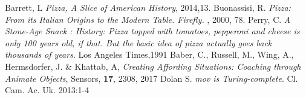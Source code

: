 \documentclass[preprint,12pt]{elsarticle}
\begin{document}
\begin{thebibliography}{00}


 Barrett, L  {\em Pizza, A Slice of American History}, 2014,13.
 Buonassisi, R. {\em Pizza: From its Italian Origins to the Modern Table. Firefly.} , 2000, 78.
 Perry, C. {\em A Stone-Age Snack : History: Pizza topped with tomatoes, pepperoni and cheese is only 100 years old, if that. But the basic idea of pizza actually goes back thousands of years}. Los Angeles Times,1991
 Baber, C., Russell, M., Wing, A., Hermsdorfer, J. \& Khattab, A, {\em Creating Affording Situations: Coaching through Animate Objects}, Sensors, {\bf 17}, 2308, 2017
 Dolan S. {\em mov is Turing-complete}. Cl. Cam. Ac. Uk. 2013:1-4
\end{thebibliography}
\end{document}
